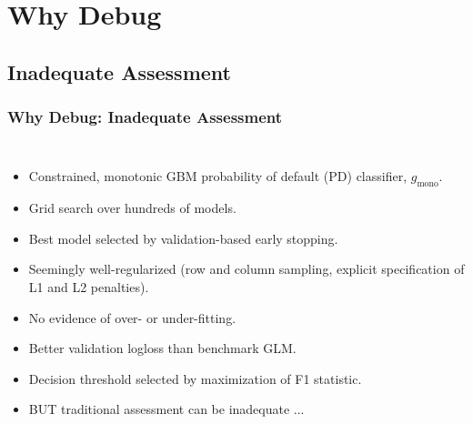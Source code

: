 \documentclass[11pt,
               aspectratio=169,
               hyperref={colorlinks}
               ]{beamer}
\begin{document}
	\section{Why Debug}

		\subsection{Inadequate Assessment}

			\begin{frame}

					\frametitle{Why Debug: Inadequate Assessment}

					\begin{columns}
						
						\centering
						\begin{itemize}
							\item \scriptsize Constrained, monotonic GBM probability of default (PD) classifier, $g_{\text{mono}}$.
							\item Grid search over hundreds of models. 
							\item Best model selected by validation-based early stopping.
							\item Seemingly well-regularized (row and column sampling, explicit specification of L1 and L2 penalties).
							\item No evidence of over- or under-fitting.
							\item Better validation logloss than benchmark GLM.
							\item Decision threshold selected by maximization of F1 statistic.
							\item BUT traditional assessment can be inadequate ... 
						\end{itemize}\normalsize
						

\end{columns}
\end{frame}
\end{document}
